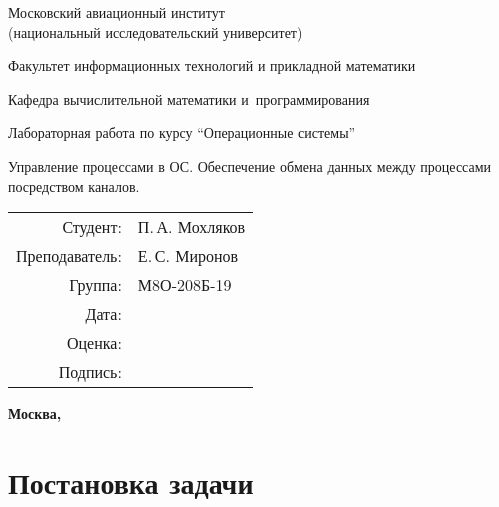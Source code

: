 \documentclass[pdf, unicode, 12pt, a4paper,oneside,fleqn]{article}
\begin{document}
\begin{titlepage}
    \begin{center}
        \bfseries

        {\Large Московский авиационный институт\\ (национальный исследовательский университет)}
        
        \vspace{48pt}
        
        {\large Факультет информационных технологий и прикладной математики}
        
        \vspace{36pt}
        
        {\large Кафедра вычислительной математики и~программирования}
        
        \vspace{48pt}
        
        Лабораторная работа  по курсу \enquote{Операционные системы}

        \vspace{48pt}

        Управление процессами в ОС. Обеспечение обмена данных между процессами посредством каналов.
    \end{center}
    
    \vspace{150pt}
    
    \begin{flushright}
    \begin{tabular}{rl}
    Студент: & П.\,А. Мохляков \\
    Преподаватель: & Е.\,С. Миронов \\
    Группа: & М8О-208Б-19 \\
    Дата: & \\
    Оценка: & \\
    Подпись: & \\
    \end{tabular}
    \end{flushright}
    
    \vfill
    
    \begin{center}
    \bfseries
    Москва, \the\year
    \end{center}
\end{titlepage}
    
\pagebreak

\section{Постановка задачи}
\end{document}
